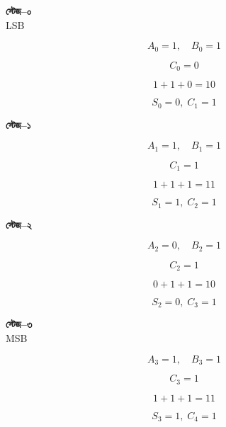 
\par\begingroup


\begin{minipage}[t]{0.235\textwidth}
\centering

\textbf{স্টেজ–০}\\[-1mm]
{\footnotesize \textenglish{LSB}}

\vspace{2mm}

\[
A_0=1,\quad B_0=1
\]

\[
C_0=0
\]

\[
1+1+0=10
\]

\[
\boxed{S_0=0,\;C_1=1}
\]

\end{minipage}
\hfill
\begin{minipage}[t]{0.235\textwidth}
\centering

\textbf{স্টেজ–১}

\vspace{4mm}

\[
A_1=1,\quad B_1=1
\]

\[
C_1=1
\]

\[
1+1+1=11
\]

\[
\boxed{S_1=1,\;C_2=1}
\]

\end{minipage}
\hfill
\begin{minipage}[t]{0.235\textwidth}
\centering

\textbf{স্টেজ–২}

\vspace{4mm}

\[
A_2=0,\quad B_2=1
\]

\[
C_2=1
\]

\[
0+1+1=10
\]

\[
\boxed{S_2=0,\;C_3=1}
\]

\end{minipage}
\hfill
\begin{minipage}[t]{0.235\textwidth}
\centering

\textbf{স্টেজ–৩}\\[-1mm]
{\footnotesize \textenglish{MSB}}

\vspace{2mm}

\[
A_3=1,\quad B_3=1
\]

\[
C_3=1
\]

\[
1+1+1=11
\]

\[
\boxed{S_3=1,\;C_4=1}
\]

\end{minipage}


